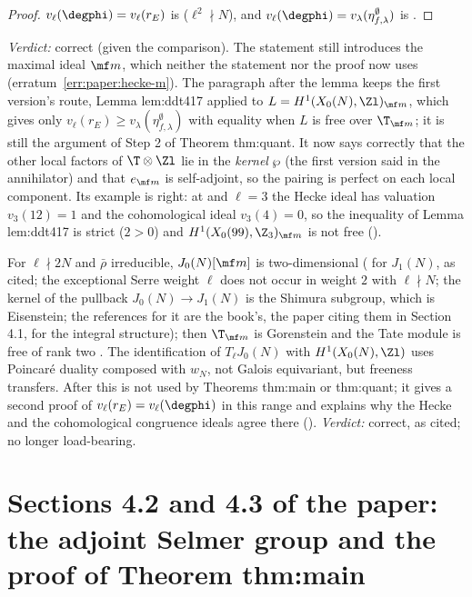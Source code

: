 \begin{sloppypar}
\begin{proof}[Proof]
$v_\ell(\degphi)=v_\ell(r_E)$ is \cite[Theorem 2.2]{ARS12} ($\ell^2\nmid N$), and $v_\ell(\degphi)=v_\lambda(\eta^\emptyset_{f,\lambda})$ is .
\end{proof}

\noindent\emph{Verdict:} correct (given the comparison). The statement still introduces the maximal ideal $\mf m$, which neither the statement nor the proof now uses
(erratum~\ref{err:paper:hecke-m}). The paragraph after the lemma keeps the first version's route, Lemma lem:ddt417 applied to $L=H^1(X_0(N),\Zl)_{\mf m}$, which gives only
$v_\ell(r_E)\ge v_\lambda(\eta^\emptyset_{f,\lambda})$ with equality when $L$ is free over $\T_{\mf m}$; it is still the argument of Step 2 of Theorem thm:quant. It now says correctly that the other
local factors of $\T\otimes\Zl$ lie in the \emph{kernel} $\wp$ (the first version said in the annihilator) and that $e_{\mf m}$ is self-adjoint, so the pairing is perfect on each local
component. Its example is right: at  and $\ell=3$ the Hecke ideal has valuation $v_3(12)=1$ and the cohomological ideal $v_3(4)=0$, so the inequality of Lemma lem:ddt417 is
strict ($2>0$) and $H^1(X_0(99),\Z_3)_{\mf m}$ is not free ().

\begin{remark}\label{rem:paper:free}
For $\ell\nmid2N$ and $\bar\rho$ irreducible, $J_0(N)[\mf m]$ is two-dimensional (\cite[Theorem 3.5]{RibetStein} for $J_1(N)$, as cited; the exceptional Serre weight $\ell$ does not occur
in weight $2$ with $\ell\nmid N$; the kernel of the pullback $J_0(N)\to J_1(N)$ is the Shimura subgroup, which is Eisenstein; the references \cite{LingOesterle,Ribet88} for
it are the book's, the paper citing them in Section 4.1, for the integral structure); then $\T_{\mf m}$ is Gorenstein and the Tate module
is free of rank two \cite{Tilouine97}. The identification of $T_\ell J_0(N)$ with $H^1(X_0(N),\Zl)$ uses Poincar\'e duality composed with $w_N$, not Galois equivariant, but freeness
transfers. After  this is not used by Theorems thm:main or thm:quant; it gives a second proof of $v_\ell(r_E)=v_\ell(\degphi)$ in this range and explains
why the Hecke and the cohomological congruence ideals agree there (). \emph{Verdict:} correct, as cited; no longer load-bearing.
\end{remark}

\section[Paper 4.2, 4.3: Theorem thm:main]{Sections 4.2 and 4.3 of the paper: the adjoint Selmer group and the proof of Theorem thm:main}\label{sec:paper:selmer}


\end{sloppypar}
